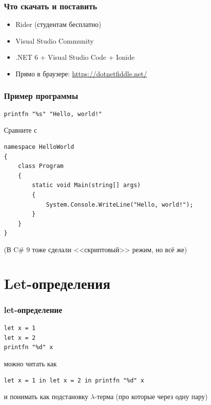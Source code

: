 \documentclass[xetex,mathserif,serif]{beamer}
\begin{document}
    \begin{frame}
        \frametitle{Что скачать и поставить}
        \begin{itemize}
            \item Rider (студентам бесплатно)
            \item Visual Studio Community
            \item .NET 6 + Visual Studio Code + Ionide
            \item Прямо в браузере: \url{https://dotnetfiddle.net/}
        \end{itemize}
    \end{frame}
    
    \begin{frame}[fragile]
        \frametitle{Пример программы}
        \begin{verbatim}
printfn "%s" "Hello, world!"
        \end{verbatim}
        Сравните с
        \begin{verbatim}
namespace HelloWorld
{
    class Program
    {
        static void Main(string[] args)
        {
            System.Console.WriteLine("Hello, world!");
        }
    }
}
        \end{verbatim}
        (В C\# 9 тоже сделали <<скриптовый>> режим, но всё же)
    \end{frame}

    \section{Let-определения}

    \begin{frame}[fragile]
        \frametitle{let-определение}
        \begin{verbatim}
let x = 1
let x = 2
printfn "%d" x
        \end{verbatim}
        можно читать как
        \begin{verbatim}
let x = 1 in let x = 2 in printfn "%d" x
        \end{verbatim}
        и понимать как подстановку $\lambda$-терма (про которые через одну пару)
    \end{frame}
\end{document}
